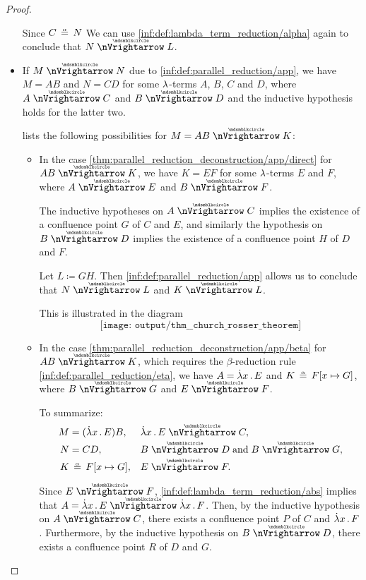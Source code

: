 \begin{proof}
\begin{itemize}
    Since \( C \aequiv N \) We can use \ref{inf:def:lambda_term_reduction/alpha} again to conclude that \( N \ppred L \).

    \item If \( M \ppred N \) due to \ref{inf:def:parallel_reduction/app}, we have \( M = AB \) and \( N = CD \) for some \( {\mathrm \lambda} \)-terms \( A \), \( B \), \( C \) and \( D \), where \( A \ppred C \) and \( B \ppred D \) and the inductive hypothesis holds for the latter two.

     lists the following possibilities for \( M = AB \ppred K \):
    \begin{itemize}
      \item In the case \cref{thm:parallel_reduction_deconstruction/app/direct} for \( AB \ppred K \), we have \( K = EF \) for some \( {\mathrm \lambda} \)-terms \( E \) and \( F \), where \( A \ppred E \) and \( B \ppred F \).

      The inductive hypotheses on \( A \ppred C \) implies the existence of a confluence point \( G \) of \( C \) and \( E \), and similarly the hypothesis on \( B \ppred D \) implies the existence of a confluence point \( H \) of \( D \) and \( F \).

      Let \( L \coloneqq GH \). Then \ref{inf:def:parallel_reduction/app} allows us to conclude that \( N \ppred L \) and \( K \ppred L \).

      This is illustrated in the diagram
      \begin{equation*}
        \texttt{[image: output/thm\_\_church\_rosser\_theorem]}
      \end{equation*}

      \item In the case \cref{thm:parallel_reduction_deconstruction/app/beta} for \( AB \ppred K \), which requires the \( \beta \)-reduction rule \ref{inf:def:parallel_reduction/eta}, we have \( A = \qabs x E \) and \( K \aequiv F[x \mapsto G] \), where \( B \ppred G \) and \( E \ppred F \).

      To summarize:
      \begin{align*}
        M &= (\qabs x E) B,           &&\qabs x E \ppred C,            \\
        N &= C D,                     &&B \ppred D \T{and} B \ppred G, \\
        K &\aequiv F[x \mapsto G],    &&E \ppred F.
      \end{align*}

      Since \( E \ppred F \), \ref{inf:def:lambda_term_reduction/abs} implies that \( A = \qabs x E \ppred \qabs x F \). Then, by the inductive hypothesis on \( A \ppred C \), there exists a confluence point \( P \) of \( C \) and \( \qabs x F \). Furthermore, by the inductive hypothesis on \( B \ppred D \), there exists a confluence point \( R \) of \( D \) and \( G \).


\end{itemize}
\end{itemize}
\end{proof}
